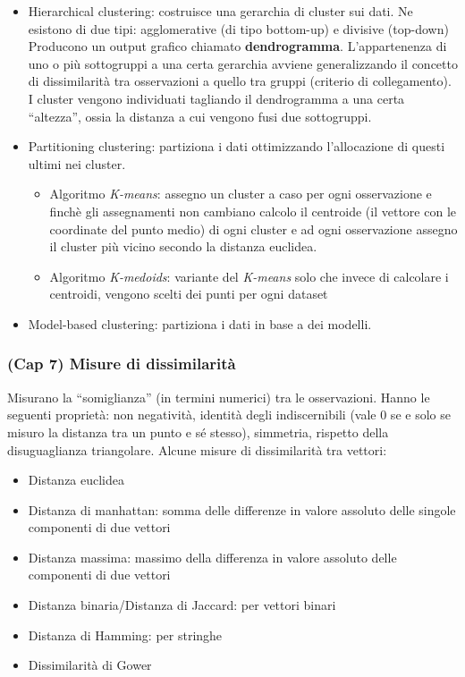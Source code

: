 \documentclass[
]{article}
\begin{document}
\begin{itemize}
\item
  Hierarchical clustering: costruisce una gerarchia di cluster sui dati.
  Ne esistono di due tipi: agglomerative (di tipo bottom-up) e divisive
  (top-down) Producono un output grafico chiamato \textbf{dendrogramma}.
  L'appartenenza di uno o più sottogruppi a una certa gerarchia avviene
  generalizzando il concetto di dissimilarità tra osservazioni a quello
  tra gruppi (criterio di collegamento). I cluster vengono individuati
  tagliando il dendrogramma a una certa ``altezza'', ossia la distanza a
  cui vengono fusi due sottogruppi.
\item
  Partitioning clustering: partiziona i dati ottimizzando l'allocazione
  di questi ultimi nei cluster.

  \begin{itemize}
  \item
    Algoritmo \emph{K-means}: assegno un cluster a caso per ogni
    osservazione e finchè gli assegnamenti non cambiano calcolo il
    centroide (il vettore con le coordinate del punto medio) di ogni
    cluster e ad ogni osservazione assegno il cluster più vicino secondo
    la distanza euclidea.
  \item
    Algoritmo \emph{K-medoids}: variante del \emph{K-means} solo che
    invece di calcolare i centroidi, vengono scelti dei punti per ogni
    dataset
  \end{itemize}
\item
  Model-based clustering: partiziona i dati in base a dei modelli.
\end{itemize}

\hypertarget{cap-7-misure-di-dissimilarituxe0}{%
\subsubsection{(Cap 7) Misure di
dissimilarità}\label{cap-7-misure-di-dissimilarituxe0}}

Misurano la ``somiglianza'' (in termini numerici) tra le osservazioni.
Hanno le seguenti proprietà: non negatività, identità degli
indiscernibili (vale 0 se e solo se misuro la distanza tra un punto e sé
stesso), simmetria, rispetto della disuguaglianza triangolare. Alcune
misure di dissimilarità tra vettori:

\begin{itemize}
\item
  Distanza euclidea
\item
  Distanza di manhattan: somma delle differenze in valore assoluto delle
  singole componenti di due vettori
\item
  Distanza massima: massimo della differenza in valore assoluto delle
  componenti di due vettori
\item
  Distanza binaria/Distanza di Jaccard: per vettori binari
\item
  Distanza di Hamming: per stringhe
\item
  Dissimilarità di Gower
\end{itemize}
\end{document}
